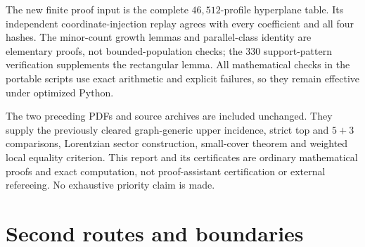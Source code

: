 \documentclass[11pt,a4paper]{article}
\theoremstyle{remark}\newtheorem{remark}[theorem]{Remark}
\begin{document}
The new finite proof input is the complete $46{,}512$-profile hyperplane table. Its independent coordinate-injection replay agrees with every coefficient and all four hashes. The minor-count growth lemmas and parallel-class identity are elementary proofs, not bounded-population checks; the 330 support-pattern verification supplements the rectangular lemma. All mathematical checks in the portable scripts use exact arithmetic and explicit failures, so they remain effective under optimized Python.

The two preceding PDFs and source archives are included unchanged. They supply the previously cleared graph-generic upper incidence, strict top and $5+3$ comparisons, Lorentzian sector construction, small-cover theorem and weighted local equality criterion. This report and its certificates are ordinary mathematical proofs and exact computation, not proof-assistant certification or external refereeing. No exhaustive priority claim is made.

\clearpage
\part{Second routes and boundaries}\label{mrn:part:five}
\end{document}

